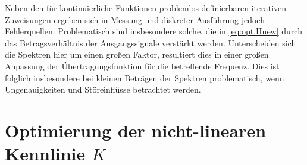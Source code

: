 \documentclass[../Report.tex]{subfiles}
\begin{document}
Neben den für kontinuierliche Funktionen problemlos definierbaren iterativen Zuweisungen ergeben sich in Messung und diskreter Ausführung jedoch Fehlerquellen. Problematisch sind insbesondere solche, die in \eqref{eq:opt.Hnew} durch das Betragsverhältnis der Ausgangssignale verstärkt werden. 
Unterscheiden sich die Spektren hier um einen großen Faktor, resultiert dies in einer großen Anpassung der Übertragungsfunktion für die betreffende Frequenz. Dies ist folglich insbesondere bei kleinen Beträgen der Spektren problematisch, wenn Ungenauigkeiten und Störeinflüsse betrachtet werden. 
\\






\section{Optimierung der nicht-linearen Kennlinie $K$}
\label{sec:opt.K}
\end{document}
